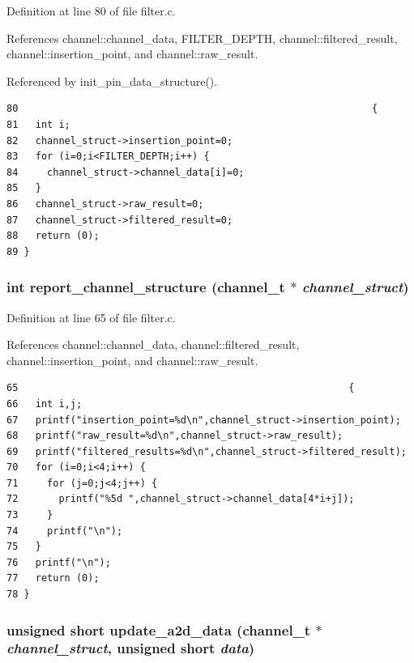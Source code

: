 Definition at line 80 of file filter.c.

References channel::channel\_\-data, FILTER\_\-DEPTH, channel::filtered\_\-result, channel::insertion\_\-point, and channel::raw\_\-result.

Referenced by init\_\-pin\_\-data\_\-structure().

\footnotesize\begin{verbatim}80                                                             {
81   int i;
82   channel_struct->insertion_point=0;
83   for (i=0;i<FILTER_DEPTH;i++) {
84     channel_struct->channel_data[i]=0;
85   }
86   channel_struct->raw_result=0;
87   channel_struct->filtered_result=0;
88   return (0);
89 }
\end{verbatim}\normalsize 


\subsubsection{\setlength{\rightskip}{0pt plus 5cm}int report\_\-channel\_\-structure ({\bf channel\_\-t} $\ast$ {\em channel\_\-struct})}\label{filter_8c_a1}




Definition at line 65 of file filter.c.

References channel::channel\_\-data, channel::filtered\_\-result, channel::insertion\_\-point, and channel::raw\_\-result.

\footnotesize\begin{verbatim}65                                                         {
66   int i,j;
67   printf("insertion_point=%d\n",channel_struct->insertion_point);
68   printf("raw_result=%d\n",channel_struct->raw_result);
69   printf("filtered_results=%d\n",channel_struct->filtered_result);
70   for (i=0;i<4;i++) {
71     for (j=0;j<4;j++) {
72       printf("%5d ",channel_struct->channel_data[4*i+j]);
73     }
74     printf("\n");
75   }
76   printf("\n");
77   return (0);
78 }
\end{verbatim}\normalsize 


\subsubsection{\setlength{\rightskip}{0pt plus 5cm}unsigned short update\_\-a2d\_\-data ({\bf channel\_\-t} $\ast$ {\em channel\_\-struct}, unsigned short {\em data})}\label{filter_8c_a0}




